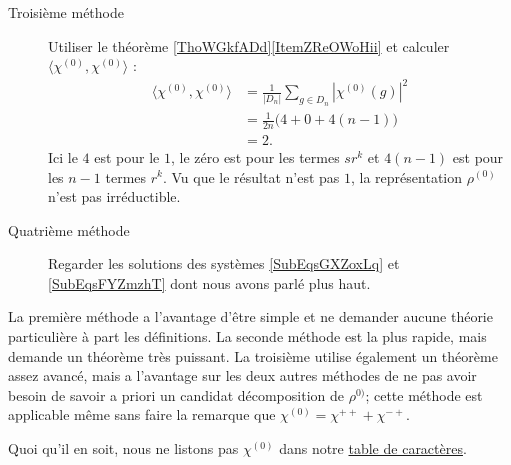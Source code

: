 \begin{enumerate}
\begin{description}
    \item[Troisième méthode]
        Utiliser le théorème \ref{ThoWGkfADd}\ref{ItemZReOWoHii} et calculer \( \langle \chi^{(0)}, \chi^{(0)}\rangle \) :
        \begin{subequations}
            \begin{align}
                \langle \chi^{(0)}, \chi^{(0)}\rangle &=\frac{1}{ | D_n | }\sum_{g\in D_n}| \chi^{(0)}(g) |^2\\
                &=\frac{1}{ 2n }\big(4+0+4(n-1)\big)\\
                &=2.
            \end{align}
        \end{subequations}
        Ici le \( 4\) est pour le \( 1\), le zéro est pour les termes \( sr^k\) et \( 4(n-1)\) est pour les \( n-1\) termes \( r^k\). Vu que le résultat n'est pas \( 1\), la représentation \( \rho^{(0)}\) n'est pas irréductible.
        
    \item[Quatrième méthode] 
        Regarder les solutions des systèmes \eqref{SubEqsGXZoxLq} et \eqref{SubEqsFYZmzhT} dont nous avons parlé plus haut.

    \end{description}

    La première méthode a l'avantage d'être simple et ne demander aucune théorie particulière à part les définitions. La seconde méthode est la plus rapide, mais demande un théorème très puissant. La troisième utilise également un théorème assez avancé, mais a l'avantage sur les deux autres méthodes de ne pas avoir besoin de savoir a priori un candidat décomposition de \( \rho^{0)}\); cette méthode est applicable même sans faire la remarque que \( \chi^{(0)}=\chi^{++}+\chi^{-+}\).

    Quoi qu'il en soit, nous ne listons pas \( \chi^{(0)}\) dans notre \href{http://fr.wikipedia.org/wiki/Aide:Unicode}{table de caractères}.


\end{enumerate}

